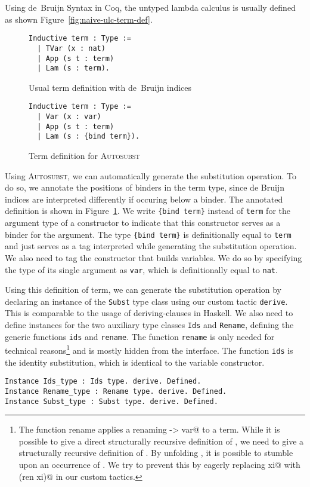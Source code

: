 \documentclass{scrartcl}
\newcommand{\Autosubst}{\textsc{Autosubst}\xspace}
\newcommand{\lst}{\lstinline}
\begin{document}
Using de~Bruijn Syntax in Coq, the untyped lambda calculus is usually defined as shown Figure~\ref{fig:naive-ulc-term-def}.
\begin{figure}
\begin{minipage}{0.45\textwidth}
  \centering
\begin{lstlisting}
Inductive term : Type :=
  | TVar (x : nat)
  | App (s t : term)
  | Lam (s : term).
\end{lstlisting}
  \caption{Usual term definition with de~Bruijn indices}
  \label{fig:naive-ulc-term-def}
\end{minipage}
\hfill
\begin{minipage}{0.45\textwidth} 
  \begin{lstlisting}
Inductive term : Type :=
  | Var (x : var)
  | App (s t : term)
  | Lam (s : {bind term}). 
\end{lstlisting}
\caption{Term definition for \Autosubst}
\label{fig:autosubst-ulc-term-def}
\end{minipage}
\end{figure}
Using \Autosubst, we can automatically generate the substitution operation.
To do so, we annotate the positions of binders in the term type, since de Bruijn indices are interpreted differently if occuring below a binder. The annotated definition is shown in Figure~\ref{fig:autosubst-ulc-term-def}.
We write \lst${bind term}$ instead of \lst$term$ for the argument type of a constructor to indicate that this constructor serves as a binder for the argument. 
The type \lst${bind term}$ is definitionally equal to \lst$term$ and just serves as a tag interpreted while generating the substitution operation.
We also need to tag the constructor that builds variables. We do so by specifying the type of its single argument as \lst$var$, which is definitionally equal to \lst$nat$.

Using this definition of term, we can generate the substitution operation \lst@subst@ by declaring an instance of the \lst$Subst$ type class using our custom tactic \lst$derive$. This is comparable to the usage of deriving-clauses in Haskell.
We also need to define instances for the two auxiliary type classes \lst$Ids$ and \lst$Rename$, defining the generic functions \lst$ids$ and \lst$rename$. 
The function \lst$rename$ is only needed for technical reasons\footnote{The function rename applies a renaming \lst@var -> var@ to a term. While it is possible to give a direct structurally recursive definition of \lst@rename@, we need \lst@rename@ to give a structurally recursive definition of \lst@subst@. By unfolding \lst@subst@, it is possible to stumble upon an occurrence of \lst@rename@. We try to prevent this by eagerly replacing \lst@rename xi@ with \lst@subst (ren xi)@ in our custom tactics.} and is mostly hidden from the interface.
The function \lst$ids$ is the identity substitution, which is identical to the variable constructor.
\begin{lstlisting}
Instance Ids_type : Ids type. derive. Defined.
Instance Rename_type : Rename type. derive. Defined.
Instance Subst_type : Subst type. derive. Defined.
\end{lstlisting}
\end{document}
